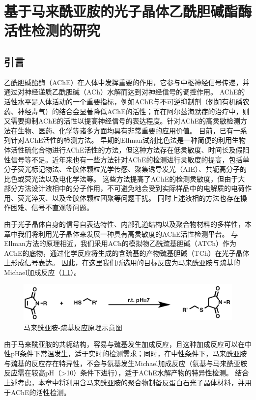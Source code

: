
\chapter{基于马来酰亚胺的光子晶体乙酰胆碱酯酶活性检测的研究}
\label{ch:maleimide}

\section{引言}
\label{sec:intro_maleimide}

乙酰胆碱酯酶（AChE）在人体中发挥重要的作用，它参与中枢神经信号传递，并通过对神经递质乙酰胆碱（ACh）水解而达到对神经信号的调控作用。
AChE的活性水平是人体活动的一个重要指标，例如AChE与不可逆抑制剂（例如有机磷农药、神经毒气）的结合会显著降低AChE的活性\cite{Ashani1992Mechanism,Tougu2001Acetylcholinesterase}；而在阿尔兹海默症的治疗中，则又需要抑制AChE的活性以提高神经信号的表达程度\cite{Bartolini2003Amyloid}。针对AChE的高灵敏检测方法在生物、医药、化学等诸多方面均具有非常重要的应用价值\cite{Miao2010History}。
目前，已有一系列针对AChE活性的检测方法。
早期的Ellman试剂比色法\cite{Ellman1959Tissue,Ellman1961New}是一种简便的利用生物体活性硫化合物进行AChE活性的方法，但这种方法存在低灵敏度、时间长及假阳性信号等不足\cite{Rhee2003Qualitative}。近年来也有一些方法针对AChE的检测进行灵敏度的提高，包括单分子荧光标记物法\cite{Maeda200524Dinitrobenzenesulfonyl}、金胶体颗粒光学传感\cite{Pavlov2005Inhibition,Liu2012Highlya}、聚集诱导发光（AIE）\cite{Peng2009Fluorescence}、共轭高分子的比色或荧光法\cite{Feng2007Continuous,Li2011Fluorescence}以及电化学法\cite{Yissar2003Acetylcholine,Lu2011Novel}等。
这些方法提高了AChE的检测灵敏度，但由于大部分方法设计液相中的分子作用，不可避免地会受到实际样品中的电解质的电荷作用、荧光淬灭、以及金胶体颗粒团聚等问题干扰\cite{Levy2004Rational,Guo2013Oriented}。
同时上述液相的方法也存在操作困难、信号不直观等问题。

由于光子晶体自身的信号自表达特性、内部孔道结构以及聚合物材料的多样性，本章中我们将利用光子晶体来发展一种具有高灵敏度的AChE活性检测平台。
与Ellman方法的原理相近，我们采用ACh的模拟物乙酰巯基胆碱（ATCh）作为AChE的底物，通过化学反应将生成的含巯基的产物巯基胆碱（TCh）在光子晶体上形成信号表达。
因此，在这里我们所选用的目标反应为马来酰亚胺与巯基的Michael加成反应（\ref{fig:maleimide-thio-principle}）。
\begin{figure}[b]
	\centering
	\includegraphics[width=0.6\linewidth]{figures/ch3/michael_addition.png}
	\caption{马来酰亚胺-巯基反应原理示意图}
	\label{fig:maleimide-thio-principle}
\end{figure}
由于马来酰亚胺的共轭结构，容易与巯基发生加成反应，且这种加成反应可以在中性pH条件下常温发生，适于实时的检测需求\cite{Marrian1949322}；同时，在中性条件下，马来酰亚胺与巯基的反应存在特异性，不会与氨基发生Michael加成反应（氨基与马来酰亚胺反应需在较高pH（>10）条件下进行），适于AChE水解产物的特异性检测。
结合上述考虑，本章中将利用含马来酰亚胺的聚合物制备反蛋白石光子晶体材料，并用于AChE的活性检测。

